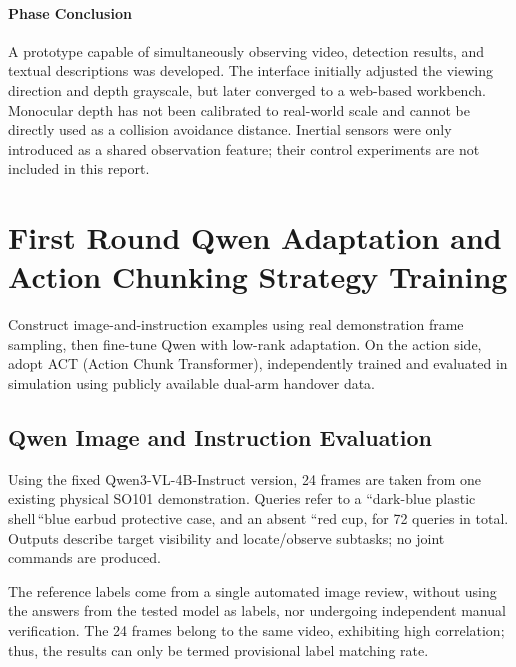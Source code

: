 
\paragraph{Phase Conclusion} A prototype capable of simultaneously observing video, detection results, and textual descriptions was developed. The interface initially adjusted the viewing direction and depth grayscale, but later converged to a web-based workbench. Monocular depth has not been calibrated to real-world scale and cannot be directly used as a collision avoidance distance. Inertial sensors were only introduced as a shared observation feature; their control experiments are not included in this report.


\FloatBarrier

\section{First Round Qwen Adaptation and Action Chunking Strategy Training}

\label{stage:s03}

Construct image-and-instruction examples using real demonstration frame sampling, then fine-tune Qwen with low-rank adaptation. On the action side, adopt ACT (Action Chunk Transformer), independently trained and evaluated in simulation using publicly available dual-arm handover data.

\subsection{Qwen Image and Instruction Evaluation}\label{s03-detail-1}

Using the fixed Qwen3-VL-4B-Instruct version, 24 frames are taken from one existing physical SO101 demonstration. Queries refer to a ``dark-blue plastic shell\,``blue earbud protective case, and an absent ``red cup, for 72 queries in total. Outputs describe target visibility and locate/observe subtasks; no joint commands are produced.

The reference labels come from a single automated image review, without using the answers from the tested model as labels, nor undergoing independent manual verification. The 24 frames belong to the same video, exhibiting high correlation; thus, the results can only be termed provisional label matching rate.


